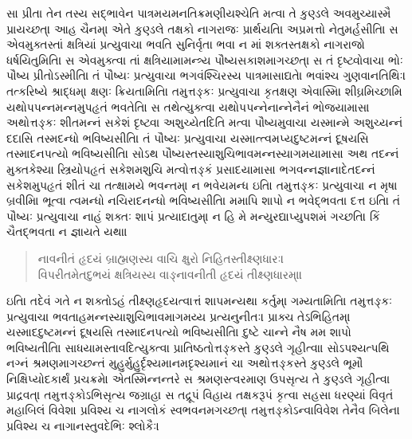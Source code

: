 \documentclass[a4paper,12pt]{article}
\begin{document}
સા પ્રીતા તેન તસ્ય સદ્ભાવેન પાત્રમયમનતિક્રમણીયશ્ચેતિ મત્વા તે કુણ્ડલે અવમુચ્યાસ્મૈ પ્રાયચ્છત્।
આહ ચૈનમ્। એતે કુણ્ડલે તક્ષકો નાગરાજઃ પ્રાર્થયતિ। અપ્રમત્તો નેતુમર્હસીતિ।
સ એવમુક્તસ્તાં ક્ષત્રિયાં પ્રત્યુવાચ। ભવતિ સુનિર્વૃતા ભવ। ન માં શક્તસ્તક્ષકો નાગરાજો ધર્ષયિતુમિતિ।
સ એવમુક્ત્વા તાં ક્ષત્રિયામામન્ત્ર્ય પૌષ્યસકાશમાગચ્છત્।
સ તં દૃષ્ટ્વોવાચ। ભોઃ પૌષ્ય પ્રીતોઽસ્મીતિ।
તં પૌષ્યઃ પ્રત્યુવાચ। ભગવંશ્ચિરસ્ય પાત્રમાસાદ્યતે। ભવાંશ્ચ ગુણવાનતિથિઃ। તત્કરિષ્યે શ્રાદ્ધમ્। ક્ષણઃ ક્રિયતામિતિ।
તમુત્તઙ્કઃ પ્રત્યુવાચ। કૃતક્ષણ એવાસ્મિ। શીઘ્રમિચ્છામિ યથોપપન્નમન્નમુપહૃતં ભવતેતિ।
સ તથેત્યુક્ત્વા યથોપપન્નેનાન્નેનૈનં ભોજયામાસ।
અથોત્તઙ્કઃ શીતમન્નં સકેશં દૃષ્ટ્વા અશુચ્યેતદિતિ મત્વા પૌષ્યમુવાચ। યસ્માન્મે અશુચ્યન્નં દદાસિ તસ્મદન્ધો ભવિષ્યસીતિ।
તં પૌષ્યઃ પ્રત્યુવાચ। યસ્માત્ત્વમપ્યદુષ્ટમન્નં દૂષયસિ તસ્માદનપત્યો ભવિષ્યસીતિ।
સોઽથ પૌષ્યસ્તસ્યાશુચિભાવમન્નસ્યાગમયામાસ।
અથ તદન્નં મુક્તકેશ્યા સ્ત્રિયોપહૃતં સકેશમશુચિ મત્વોત્તઙ્કં પ્રસાદયામાસ। ભગવન્નજ્ઞાનાદેતદન્નં સકેશમુપહૃતં શીતં ચ। તત્ક્ષામયે ભવન્તમ્। ન ભવેયમન્ધ ઇતિ।
તમુત્તઙ્કઃ પ્રત્યુવાચ। ન મૃષા બ્રવીમિ। ભૂત્વા ત્વમન્ધો નચિરાદનન્ધો ભવિષ્યસીતિ। મમાપિ શાપો ન ભવેદ્ભવતા દત્ત ઇતિ।
તં પૌષ્યઃ પ્રત્યુવાચ। નાહં શક્તઃ શાપં પ્રત્યાદાતુમ્। ન હિ મે મન્યુરદ્યાપ્યુપશમં ગચ્છતિ। કિં ચૈતદ્ભવતા ન જ્ઞાયતે યથા।
\begin{verse}
નાવનીતં હૃદયં બ્રાહ્મણસ્ય વાચિ ક્ષુરો નિહિતસ્તીક્ષ્ણધારઃ। \\
વિપરીતમેતદુભયં ક્ષત્રિયસ્ય વાઙ્નાવનીતી હૃદયં તીક્ષ્ણધારમ્॥ \\
\end{verse}
ઇતિ। તદેવં ગતે ન શક્તોઽહં તીક્ષ્ણહૃદયત્વાત્તં શાપમન્યથા કર્તુમ્। ગમ્યતામિતિ।
તમુત્તઙ્કઃ પ્રત્યુવાચ। ભવતાહમન્નસ્યાશુચિભાવમાગમય્ય પ્રત્યનુનીતઃ। પ્રાક્ચ તેઽભિહિતમ્। યસ્માદદુષ્ટમન્નં દૂષયસિ તસ્માદનપત્યો ભવિષ્યસીતિ। દુષ્ટે ચાન્ને નૈષ મમ શાપો ભવિષ્યતીતિ।
સાધયામસ્તાવદિત્યુક્ત્વા પ્રાતિષ્ઠતોત્તઙ્કસ્તે કુણ્ડલે ગૃહીત્વા।
સોઽપશ્યત્પથિ નગ્નં શ્રમણમાગચ્છન્તં મુહુર્મુહુર્દૃશ્યમાનમદૃશ્યમાનં ચ। અથોત્તઙ્કસ્તે કુણ્ડલે ભૂમૌ નિક્ષિપ્યોદકાર્થં પ્રચક્રમે।
એતસ્મિન્નન્તરે સ શ્રમણસ્ત્વરમાણ ઉપસૃત્ય તે કુણ્ડલે ગૃહીત્વા પ્રાદ્રવત્। તમુત્તઙ્કોઽભિસૃત્ય જગ્રાહ। સ તદ્રૂપં વિહાય તક્ષકરૂપં કૃત્વા સહસા ધરણ્યાં વિવૃતં મહાબિલં વિવેશ।
પ્રવિશ્ય ચ નાગલોકં સ્વભવનમગચ્છત્। તમુત્તઙ્કોઽન્વાવિવેશ તેનૈવ બિલેન। પ્રવિશ્ય ચ નાગાનસ્તુવદેભિઃ શ્લોકૈઃ।
\end{document}
